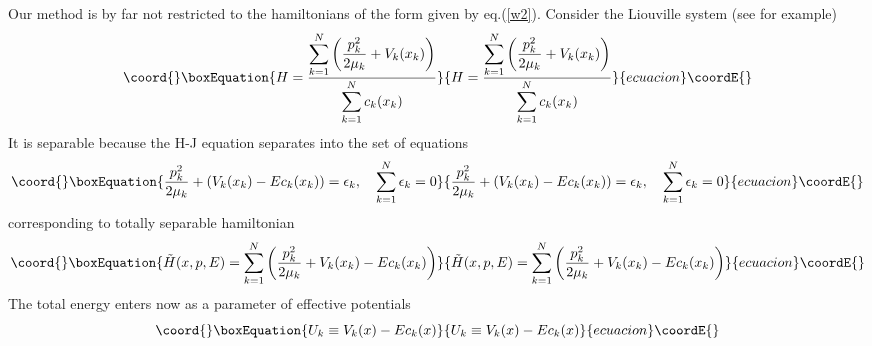 \documentclass[a4paper,12pt]{article}
\begin{document}
Our method is by far not restricted to the hamiltonians of the form given by eq.(\ref{w2}).
Consider the Liouville system (see \cite{9} for example)
\begin{equation}\coord{}\boxEquation{
H=\frac{\displaystyle \sum_{k=1}^N\left(\frac{p_k^2}{2\mu_k}+V_k(x_k)\right)}{\displaystyle
\sum_{k=1}^Nc_k(x_k)}
\label{w19}
}{
H=\frac{\displaystyle \sum_{k=1}^N\left(\frac{p_k^2}{2\mu_k}+V_k(x_k)\right)}{\displaystyle
\sum_{k=1}^Nc_k(x_k)}
}{ecuacion}\coordE{}\end{equation}
It is separable because the H-J equation \coordHE{} separates into the set of equations
\begin{equation}\coord{}\boxEquation{
\frac{p_k^2}{2\mu_k}+(V_k(x_k)-Ec_k(x_k))=\epsilon_k, \ \ \ \sum_{k=1}^N\epsilon_k=0
\label{w20}
}{
\frac{p_k^2}{2\mu_k}+(V_k(x_k)-Ec_k(x_k))=\epsilon_k, \ \ \ \sum_{k=1}^N\epsilon_k=0
}{ecuacion}\coordE{}\end{equation}
corresponding to totally separable hamiltonian
\begin{equation}\coord{}\boxEquation{
\tilde{H}(x,p,E)=\sum_{k=1}^N\left(\frac{p_k^2}{2\mu_k}+V_k(x_k)-Ec_k(x_k)\right)
\label{w21}
}{
\tilde{H}(x,p,E)=\sum_{k=1}^N\left(\frac{p_k^2}{2\mu_k}+V_k(x_k)-Ec_k(x_k)\right)
}{ecuacion}\coordE{}\end{equation}
The total energy \coordHE{} enters now as a parameter of effective potentials
\begin{equation}\coord{}\boxEquation{
U_k\equiv V_k(x)-Ec_k(x)
\label{w22}
}{
U_k\equiv V_k(x)-Ec_k(x)
}{ecuacion}\coordE{}\end{equation}
\end{document}
